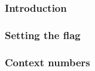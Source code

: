 \subsubsection{Introduction}                     \label{hub: generalities: context: intro}                                  
\subsubsection{Setting the \cmc{} flag}          \label{hub: generalities: context: cmc flag}                               
\subsubsection{Context numbers}                  \label{hub: generalities: context: context numbers}                        
